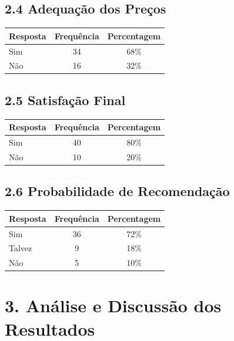 \documentclass[11pt,a4paper]{article}
\begin{document}
\vspace{0.6cm}

\subsection*{2.4 Adequação dos Preços}

\begin{tabular}{lcc}
\toprule
\rowcolor{gray!10}
\textbf{Resposta} & \textbf{Frequência} & \textbf{Percentagem} \\
\midrule
Sim & 34 & 68\% \\
Não & 16 & 32\% \\
\bottomrule
\end{tabular}

\vspace{0.6cm}

\subsection*{2.5 Satisfação Final}

\begin{tabular}{lcc}
\toprule
\rowcolor{gray!10}
\textbf{Resposta} & \textbf{Frequência} & \textbf{Percentagem} \\
\midrule
Sim & 40 & 80\% \\
Não & 10 & 20\% \\
\bottomrule
\end{tabular}

\vspace{0.6cm}

\subsection*{2.6 Probabilidade de Recomendação}

\begin{tabular}{lcc}
\toprule
\rowcolor{gray!10}
\textbf{Resposta} & \textbf{Frequência} & \textbf{Percentagem} \\
\midrule
Sim & 36 & 72\% \\
Talvez & 9 & 18\% \\
Não & 5 & 10\% \\
\bottomrule
\end{tabular}
\vspace{0.8cm}

\section*{3. Análise e Discussão dos Resultados}
\end{document}
